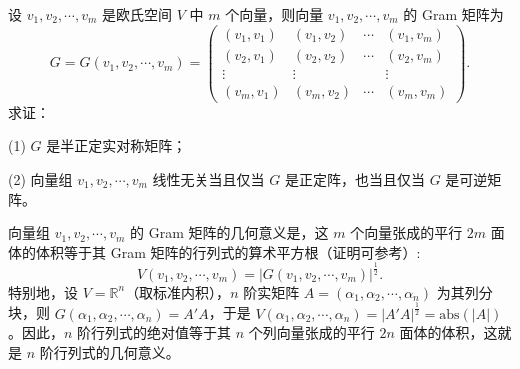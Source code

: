 \documentclass[../../main.tex]{subfiles}
\begin{document}
\begin{proposition}[欧氏空间中Gram阵的性质]\label{proposition:欧氏空间中Gram阵的性质-例9.5}
设 $v_1,v_2,\cdots,v_m$ 是欧氏空间 $V$ 中 $m$ 个向量，则向量 $v_1,v_2,\cdots,v_m$ 的 Gram 矩阵为
\[
G = G(v_1,v_2,\cdots,v_m)=\begin{pmatrix}
(v_1,v_1) & (v_1,v_2) & \cdots & (v_1,v_m)\\
(v_2,v_1) & (v_2,v_2) & \cdots & (v_2,v_m)\\
\vdots & \vdots & & \vdots\\
(v_m,v_1) & (v_m,v_2) & \cdots & (v_m,v_m)
\end{pmatrix}.
\]
求证：

(1) $G$ 是半正定实对称矩阵；

(2) 向量组 $v_1,v_2,\cdots,v_m$ 线性无关当且仅当 $G$ 是正定阵，也当且仅当 $G$ 是可逆矩阵。
\end{proposition}
\begin{remark}
向量组 $v_1,v_2,\cdots,v_m$ 的 Gram 矩阵的几何意义是，这 $m$ 个向量张成的平行 $2m$ 面体的体积等于其 Gram 矩阵的行列式的算术平方根（证明可参考）:
\[
V(v_1,v_2,\cdots,v_m)=|G(v_1,v_2,\cdots,v_m)|^{\frac{1}{2}}.
\]
特别地，设 $V = \mathbb{R}^n$（取标准内积），$n$ 阶实矩阵 $A = (\alpha_1,\alpha_2,\cdots,\alpha_n)$ 为其列分块，则 $G(\alpha_1,\alpha_2,\cdots,\alpha_n)=A'A$，于是 $V(\alpha_1,\alpha_2,\cdots,\alpha_n)=|A'A|^{\frac{1}{2}}=\text{abs}(|A|)$。因此，$n$ 阶行列式的绝对值等于其 $n$ 个列向量张成的平行 $2n$ 面体的体积，这就是 $n$ 阶行列式的几何意义。 
\end{remark}
\end{document}
